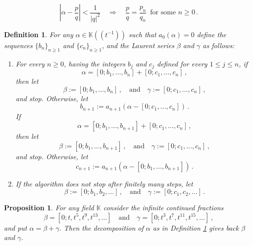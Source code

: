 \documentclass[10pt,a4paper]{amsart}
\newtheorem{defn}{Definition}
\newtheorem{prop}{Proposition}
\def\bbk{\mathbb{K}}
\def\defeq{:=}
\def\fq{\bbk}
\def\fqttt{\fq\!\left(\!\left(t^{-1}\right)\!\right)}
\begin{document}
\begin{equation}\label{eq:common4}
    \left|\alpha-\frac{p}{q} \right|<\frac{1}{|q|^2} \quad\Longrightarrow\quad \frac pq=\frac {p_n}{q_n}\,\textrm{ for some $n\geq0$}\,. 
\end{equation}

\begin{defn}\label{def:shulga_an}
For any $\alpha\in\fqttt$ such that $a_0(\alpha)=0$ define the sequences $\{b_n\}_{n\geq1}$ and $\{c_n\}_{n\geq1}$, and the Laurent series $\beta$ and $\gamma$ as follows:
\begin{enumerate}
\item
For every $n\geq0$, having the integers $b_j$ and $c_j$ defined for every $1\leq j\leq n$, if
\begin{equation*}
\alpha=[0;b_1,\ldots,b_{n}]+[0;c_1,\ldots,c_{n}]\,,
\end{equation*}
then let
$$\beta\defeq[0;b_1,\ldots,b_{n}]\,, \quad \textrm{and}\quad \gamma\defeq[0;c_1,\ldots,c_{n}]\,,$$
and stop. Otherwise, let
\begin{equation*}
b_{n+1} \defeq a_{n+1}(\alpha-[0;c_1,\ldots,c_{n}])\,.
\end{equation*}
If 
\begin{equation*}
\alpha=[0;b_1,\ldots,b_{n+1}]+[0;c_1,\ldots,c_{n}]\,,
\end{equation*}
then let 
$$\beta\defeq[0;b_1,\ldots,b_{n+1}]\,, \quad \textrm{and}\quad \gamma\defeq[0;c_1,\ldots,c_{n}]\,,$$ 
and stop. Otherwise, let 
\begin{equation*}
c_{n+1} \defeq a_{n+1}(\alpha-[0;b_1,\ldots,b_{n+1}])\,.
\end{equation*}
\item If the algorithm does not stop after finitely many steps, let 
$$\beta\defeq[0;b_1,b_2,\ldots]\,, \quad \textrm{and}\quad \gamma\defeq[0;c_1,c_2,\ldots]\,.$$ 
\end{enumerate}
\end{defn}

\begin{prop}
For any field $\fq$ consider the infinite continued fractions
\begin{equation}
\label{beta_gamma_def}
\beta=[0;t,t^5,t^9,t^{13},\ldots]\quad\text{and}\quad
\gamma=[0;t^3,t^7,t^{11},t^{15},\ldots]\,,
\end{equation}
and put $\alpha=\beta+\gamma$. Then the decomposition of $\alpha$ as in Definition \ref{def:shulga_an} gives back $\beta$ and $\gamma$.    
\end{prop}
\end{document}
